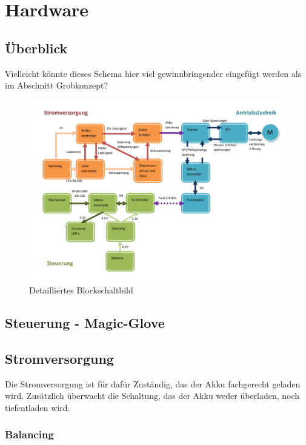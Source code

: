 \chapter{Hardware}
\label{Hardware}
\section{Überblick}

Vielleicht könnte dieses Schema hier viel gewinnbringender eingefügt werden als im Abschnitt Grobkonzept?

\begin{figure}[H]
	\centering
	\includegraphics[width=1\linewidth]{images/Grobkonzept_Blockschaltbild_detailliert}
	\caption[Detailliertes Blockschaltbild]{Detailliertes Blockschaltbild}
	\label{fig:grobkonzeptblockschaltbilddetailliert_2}
\end{figure}


\section{Steuerung - Magic-Glove}
\label{HW_MagicGlove}

\section{Stromversorgung}
\label{HW_Stromversorgung}
Die Stromversorgung ist für dafür Zuständig, das der Akku fachgerecht geladen wird. Zusätzlich überwacht die Schaltung, das der Akku weder überladen, noch tiefentladen wird.
\subsection*{Balancing}


